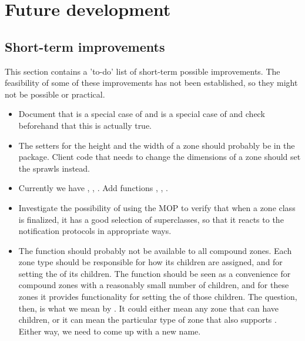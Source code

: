 \chapter{Future development}

\section{Short-term improvements}

This section contains a 'to-do' list of short-term possible
improvements.  The feasibility of some of these improvements has not
been established, so they might not be possible or practical. 

\begin{itemize}
\item Document that  is a special case of 
  and  is a  special case of  and check
  beforehand that this is actually true. 

\item The setters for the height and the width of a zone should
  probably be in the  package.  Client code that needs
  to change the dimensions of a zone should set the sprawls instead. 

\item Currently we have , ,
  .  Add functions 
  , ,
  .

\item Investigate the possibility of using the MOP to verify that when
  a zone class is finalized, it has a good selection of superclasses,
  so that it reacts to the notification protocols in appropriate ways.

\item The function  should probably not be
  available to all compound zones. Each zone type should be
  responsible for how its children are assigned, and for setting the
   of its children.  The function  should be seen as a convenience for compound
  zones with a reasonably small number of children, and for these
  zones it provides functionality for setting the  of
  those children.  The question, then, is what we mean by
  .  It could either mean any zone that can have
  children, or it can mean the particular type of zone that also
  supports .  Either way, we need to come
  up with a new name. 

\end{itemize}
